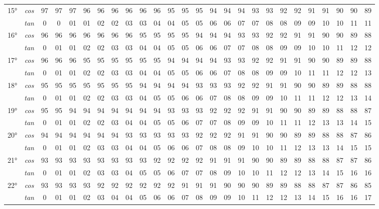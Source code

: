 \begin{tiny}
\begin{longtable}{c c |c |c |c |c |c |c |c |c |c |c |c |c |c |c |c |c |c |c |c |c |c |c |c |c}
		\multirow{2}{*}{15°}&\textit{cos}& 97& 97& 97& 96& 96& 96& 96& 96& 96& 95& 95& 95& 94& 94& 94& 93& 93& 92& 92& 91& 91& 90& 90& 89\\* \space&\textit{tan} & 0 & 0 & 01 & 01 & 02 & 02 & 03 & 03 & 04 & 04 & 05 & 05 & 06 & 06 & 07 & 07 & 08 & 08 & 09 & 09& 10& 10& 11& 11\\\hline
		\multirow{2}{*}{16°}&\textit{cos}& 96& 96& 96& 96& 96& 96& 96& 95& 95& 95& 95& 94& 94& 94& 93& 93& 92& 92& 91& 91& 90& 90& 89& 88\\* \space&\textit{tan} & 0 & 01 & 01 & 02 & 02 & 03 & 03 & 04 & 04 & 05 & 05 & 06 & 06 & 07 & 07 & 08 & 08 & 09 & 09& 10& 10& 11& 12& 12\\\hline
		\multirow{2}{*}{17°}&\textit{cos}& 96& 96& 96& 95& 95& 95& 95& 95& 95& 94& 94& 94& 94& 93& 93& 92& 92& 91& 91& 90& 90& 89& 89& 88\\* \space&\textit{tan} & 0 & 01 & 01 & 02 & 02 & 03 & 03 & 04 & 04 & 05 & 05 & 06 & 06 & 07 & 08 & 08 & 09 & 09& 10& 11& 11& 12& 12& 13\\\hline
		\multirow{2}{*}{18°}&\textit{cos}& 95& 95& 95& 95& 95& 95& 95& 94& 94& 94& 94& 93& 93& 93& 92& 92& 91& 91& 90& 90& 89& 89& 88& 88\\* \space&\textit{tan} & 0 & 01 & 01 & 02 & 02 & 03 & 03 & 04 & 05 & 05 & 06 & 06 & 07 & 08 & 08 & 09 & 09& 10& 11& 11& 12& 12& 13& 14\\\hline
		\multirow{2}{*}{19°}&\textit{cos}& 95& 95& 94& 94& 94& 94& 94& 94& 94& 93& 93& 93& 92& 92& 92& 91& 91& 90& 90& 89& 89& 88& 88& 87\\* \space&\textit{tan} & 0 & 01 & 01 & 02 & 02 & 03 & 04 & 04 & 05 & 05 & 06 & 07 & 07 & 08 & 09 & 09& 10& 11& 11& 12& 13& 13& 14& 15\\\hline
		\multirow{2}{*}{20°}&\textit{cos}& 94& 94& 94& 94& 94& 94& 93& 93& 93& 93& 93& 92& 92& 92& 91& 91& 90& 90& 89& 89& 88& 88& 87& 86\\* \space&\textit{tan} & 0 & 01 & 01 & 02 & 03 & 03 & 04 & 04 & 05 & 06 & 06 & 07 & 08 & 08 & 09& 10& 10& 11& 12& 13& 13& 14& 15& 15\\\hline
		\multirow{2}{*}{21°}&\textit{cos}& 93& 93& 93& 93& 93& 93& 93& 93& 92& 92& 92& 92& 91& 91& 91& 90& 90& 89& 89& 88& 88& 87& 87& 86\\* \space&\textit{tan} & 0 & 01 & 01 & 02 & 03 & 03 & 04 & 05 & 05 & 06 & 07 & 07 & 08 & 09& 10& 10& 11& 12& 12& 13& 14& 15& 16& 16\\\hline
		\multirow{2}{*}{22°}&\textit{cos}& 93& 93& 93& 93& 92& 92& 92& 92& 92& 92& 91& 91& 91& 90& 90& 90& 89& 89& 88& 88& 87& 87& 86& 85\\* \space&\textit{tan} & 0 & 01 & 01 & 02 & 03 & 04 & 04 & 05 & 06 & 06 & 07 & 08 & 09 & 09& 10& 11& 12& 12& 13& 14& 15& 16& 16& 17\\\hline

\end{longtable}
\end{tiny}
